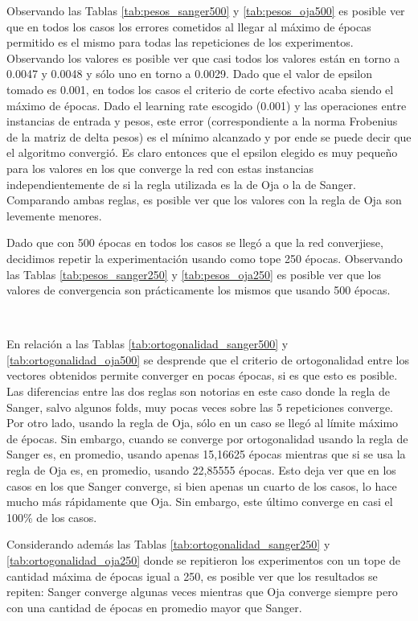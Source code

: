 \documentclass[informe.tex]{subfiles}
\begin{document}
	
	Observando las Tablas \ref{tab:pesos_sanger500} y \ref{tab:pesos_oja500} es posible ver que en todos los casos los errores cometidos al llegar al máximo de épocas permitido es el mismo para todas las repeticiones de los experimentos. Observando los valores es posible ver que casi todos los valores están en torno a 0.0047 y 0.0048 y sólo uno en torno a 0.0029. Dado que el valor de epsilon tomado es 0.001, en todos los casos el criterio de corte efectivo acaba siendo el máximo de épocas. Dado el learning rate escogido (0.001) y las operaciones entre instancias de entrada y pesos, este error (correspondiente a la norma Frobenius de la matriz de delta pesos) es el mínimo alcanzado y por ende se puede decir que el algoritmo convergió. Es claro entonces que el epsilon elegido es muy pequeño para los valores en los que converge la red con estas instancias independientemente de si la regla utilizada es la de Oja o la de Sanger. Comparando ambas reglas, es posible ver que los valores con la regla de Oja son levemente menores.
	
	Dado que con 500 épocas en todos los casos se llegó a que la red converjiese, decidimos repetir la experimentación usando como tope 250 épocas. Observando las Tablas \ref{tab:pesos_sanger250} y \ref{tab:pesos_oja250} es posible ver que los valores de convergencia son prácticamente los mismos que usando 500 \'epocas. 
	
	~
	
	En relación a las Tablas \ref{tab:ortogonalidad_sanger500} y \ref{tab:ortogonalidad_oja500} se desprende que el criterio de ortogonalidad entre los vectores obtenidos permite converger en pocas épocas, si es que esto es posible. Las diferencias entre las dos reglas son notorias en este caso donde la regla de Sanger, salvo algunos folds, muy pocas veces sobre las 5 repeticiones converge. Por otro lado, usando la regla de Oja, sólo en un caso se llegó al límite máximo de épocas. Sin embargo, cuando se converge por ortogonalidad usando la regla de Sanger es, en promedio, usando apenas 15,16625 épocas mientras que si se usa la regla de Oja es, en promedio, usando 22,85555 épocas. Esto deja ver que en los casos en los que Sanger converge, si bien apenas un cuarto de los casos, lo hace mucho más rápidamente que Oja. Sin embargo, este último converge en casi el 100\% de los casos. 
	
	Considerando además las Tablas \ref{tab:ortogonalidad_sanger250} y \ref{tab:ortogonalidad_oja250} donde se repitieron los experimentos con un tope de cantidad máxima de épocas igual a 250, es posible ver que los resultados se repiten: Sanger converge algunas veces mientras que Oja converge siempre pero con una cantidad de épocas en promedio mayor que Sanger.
	
\end{document}
